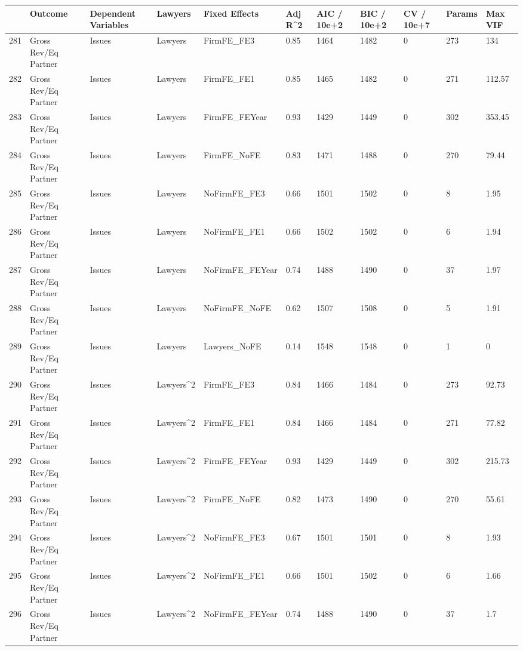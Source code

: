 \documentclass{article}
\begin{document}
\begin{table}[H]
\centering
\begin{tabular}{rllllllllll}
  \hline
 & Outcome & Dependent Variables & Lawyers & Fixed Effects & Adj R^2 & AIC / 10e+2 & BIC / 10e+2 & CV / 10e+7 & Params & Max VIF \\ 
  \hline
281 & Gross Rev/Eq Partner & Issues & Lawyers & FirmFE\_FE3 & 0.85 & 1464 & 1482 & 0 & 273 & 134 \\ 
  282 & Gross Rev/Eq Partner & Issues & Lawyers & FirmFE\_FE1 & 0.85 & 1465 & 1482 & 0 & 271 & 112.57 \\ 
  283 & Gross Rev/Eq Partner & Issues & Lawyers & FirmFE\_FEYear & 0.93 & 1429 & 1449 & 0 & 302 & 353.45 \\ 
  284 & Gross Rev/Eq Partner & Issues & Lawyers & FirmFE\_NoFE & 0.83 & 1471 & 1488 & 0 & 270 & 79.44 \\ 
  285 & Gross Rev/Eq Partner & Issues & Lawyers & NoFirmFE\_FE3 & 0.66 & 1501 & 1502 & 0 & 8 & 1.95 \\ 
  286 & Gross Rev/Eq Partner & Issues & Lawyers & NoFirmFE\_FE1 & 0.66 & 1502 & 1502 & 0 & 6 & 1.94 \\ 
  287 & Gross Rev/Eq Partner & Issues & Lawyers & NoFirmFE\_FEYear & 0.74 & 1488 & 1490 & 0 & 37 & 1.97 \\ 
  288 & Gross Rev/Eq Partner & Issues & Lawyers & NoFirmFE\_NoFE & 0.62 & 1507 & 1508 & 0 & 5 & 1.91 \\ 
  289 & Gross Rev/Eq Partner & Issues & Lawyers & Lawyers\_NoFE & 0.14 & 1548 & 1548 & 0 & 1 & 0 \\ 
  290 & Gross Rev/Eq Partner & Issues & Lawyers^2 & FirmFE\_FE3 & 0.84 & 1466 & 1484 & 0 & 273 & 92.73 \\ 
  291 & Gross Rev/Eq Partner & Issues & Lawyers^2 & FirmFE\_FE1 & 0.84 & 1466 & 1484 & 0 & 271 & 77.82 \\ 
  292 & Gross Rev/Eq Partner & Issues & Lawyers^2 & FirmFE\_FEYear & 0.93 & 1429 & 1449 & 0 & 302 & 215.73 \\ 
  293 & Gross Rev/Eq Partner & Issues & Lawyers^2 & FirmFE\_NoFE & 0.82 & 1473 & 1490 & 0 & 270 & 55.61 \\ 
  294 & Gross Rev/Eq Partner & Issues & Lawyers^2 & NoFirmFE\_FE3 & 0.67 & 1501 & 1501 & 0 & 8 & 1.93 \\ 
  295 & Gross Rev/Eq Partner & Issues & Lawyers^2 & NoFirmFE\_FE1 & 0.66 & 1501 & 1502 & 0 & 6 & 1.66 \\ 
  296 & Gross Rev/Eq Partner & Issues & Lawyers^2 & NoFirmFE\_FEYear & 0.74 & 1488 & 1490 & 0 & 37 & 1.7 \\ 

\end{tabular}
\end{table}
\end{document}
